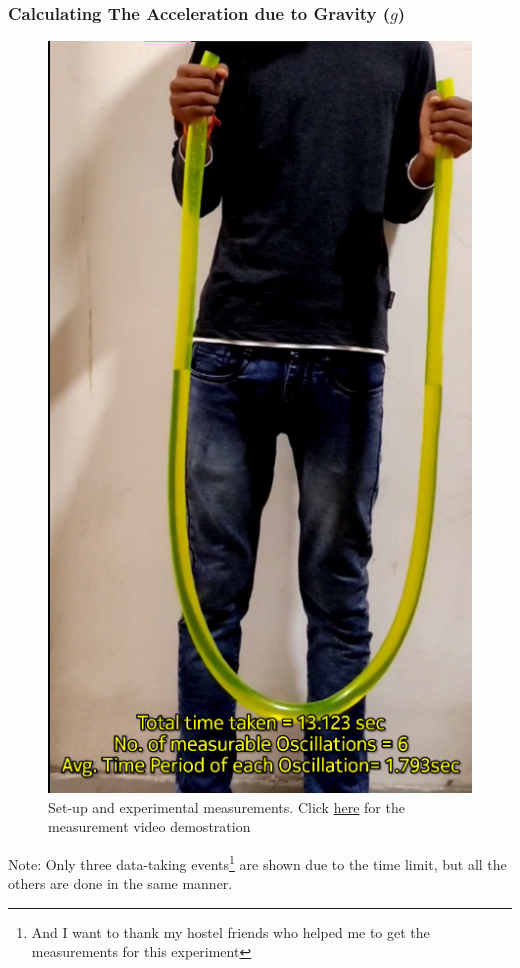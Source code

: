 \documentclass[twocolumn,11pt]{article}
\begin{document}
\subsubsection{Calculating The Acceleration due to Gravity ($g$)}
\begin{figure}[H]
    \centering
    \includegraphics[scale =0.4]{abhinandan-holding pipe.png}
    \caption{Set-up and experimental measurements. Click \href{https://drive.google.com/file/d/1sTAGJjE_yXGOSd3VcdA2fcaamWB1AhRL/view?usp=drive_link}{here} for the measurement video demostration}
    \label{Video_demo_abinandan}
\end{figure}
    Note: Only three data-taking events\footnote{And I want to thank my hostel friends who helped me to get the measurements for this experiment} are shown due to the time limit, but all the others are done in the same manner. 
    
\end{document}
